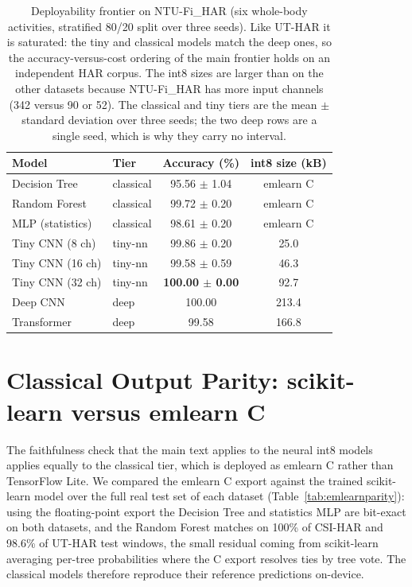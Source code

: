 \documentclass[10pt,journal,twocolumn]{IEEEtran}
\begin{document}
\begin{table}[t]
\caption{Deployability frontier on NTU-Fi\_HAR (six whole-body activities, stratified 80/20 split over three seeds). Like UT-HAR it is saturated: the tiny and classical models match the deep ones, so the accuracy-versus-cost ordering of the main frontier holds on an independent HAR corpus. The int8 sizes are larger than on the other datasets because NTU-Fi\_HAR has more input channels (342 versus 90 or 52). The classical and tiny tiers are the mean $\pm$ standard deviation over three seeds; the two deep rows are a single seed, which is why they carry no interval.}
\label{tab:ntufi}
\centering
\footnotesize
\setlength{\tabcolsep}{4pt}
\begin{tabular}{llcc}
\toprule
Model & Tier & Accuracy (\%) & int8 size (kB) \\
\midrule
Decision Tree    & classical & 95.56 $\pm$ 1.04 & emlearn C \\
Random Forest    & classical & 99.72 $\pm$ 0.20 & emlearn C \\
MLP (statistics) & classical & 98.61 $\pm$ 0.20 & emlearn C \\
Tiny CNN (8 ch)  & tiny-nn   & 99.86 $\pm$ 0.20 & 25.0 \\
Tiny CNN (16 ch) & tiny-nn   & 99.58 $\pm$ 0.59 & 46.3 \\
Tiny CNN (32 ch) & tiny-nn   & \textbf{100.00 $\pm$ 0.00} & 92.7 \\
Deep CNN         & deep      & 100.00 & 213.4 \\
Transformer      & deep      & 99.58 & 166.8 \\
\bottomrule
\end{tabular}
\end{table}

\section{Classical Output Parity: scikit-learn versus emlearn C}
The faithfulness check that the main text applies to the neural int8 models applies equally to the classical tier, which is deployed as emlearn C rather than TensorFlow Lite. We compared the emlearn C export against the trained scikit-learn model over the full real test set of each dataset (Table~\ref{tab:emlearnparity}): using the floating-point export the Decision Tree and statistics MLP are bit-exact on both datasets, and the Random Forest matches on 100\% of CSI-HAR and 98.6\% of UT-HAR test windows, the small residual coming from scikit-learn averaging per-tree probabilities where the C export resolves ties by tree vote. The classical models therefore reproduce their reference predictions on-device.
\end{document}
